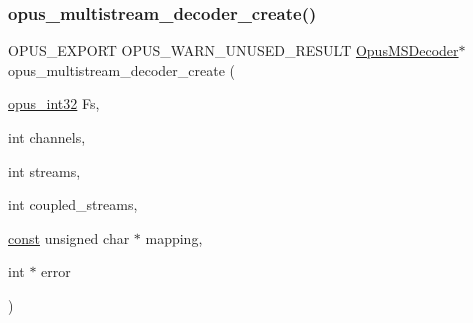 \subsubsection{\texorpdfstring{opus\+\_\+multistream\+\_\+decoder\+\_\+create()}{opus\_multistream\_decoder\_create()}}
{\footnotesize\ttfamily O\+P\+U\+S\+\_\+\+E\+X\+P\+O\+RT O\+P\+U\+S\+\_\+\+W\+A\+R\+N\+\_\+\+U\+N\+U\+S\+E\+D\+\_\+\+R\+E\+S\+U\+LT \hyperlink{group__opus__multistream_gad3497495deb9a8ace82e76cd4f93e0e4}{Opus\+M\+S\+Decoder}$\ast$ opus\+\_\+multistream\+\_\+decoder\+\_\+create (\begin{DoxyParamCaption}\item[{\hyperlink{opus__types_8h_aa4d309d6f80b99dbabebc8f98879ab9a}{opus\+\_\+int32}}]{Fs,  }\item[{int}]{channels,  }\item[{int}]{streams,  }\item[{int}]{coupled\+\_\+streams,  }\item[{\hyperlink{zconf_8h_a2c212835823e3c54a8ab6d95c652660e}{const} unsigned char $\ast$}]{mapping,  }\item[{int $\ast$}]{error }\end{DoxyParamCaption})}


